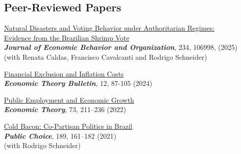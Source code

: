 \documentclass[mm, 10pt]{simple_style}
\begin{document}
\begin{resume}
\begin{minipage}[t]{0.7\textwidth}
\end{minipage}



\section{Peer-Reviewed Papers}
\href{https://doi.org/10.1016/j.jebo.2025.106998}{Natural Disasters and Voting Behavior under Authoritarian Regimes:\\ Evidence from the Brazilian Shrimp Vote} \\
\textbf{\textit{Journal of Economic Behavior and Organization}}, 234, 106998, (2025) \\
(with Renata Caldas, Francisco Cavalcanti and Rodrigo Schneider) 

\href{https://doi.org/10.1007/s40505-024-00265-x}{Financial Exclusion and Inflation Costs}\\
\textbf{\textit{Economic Theory Bulletin}}, 12, 87-105 (2024) 


\href{https://doi.org/10.1007/s00199-020-01333-6}{Public Employment and Economic Growth}\\
\textbf{\textit{Economic Theory}}, 73, 211–236 (2022)  

\href{https://doi.org/10.1007/s11127-020-00869-4}{Cold Bacon: Co-Partisan Politics in Brazil} \\
\textbf{\textit{Public Choice}}, 189, 161–182 (2021) \\
(with Rodrigo Schneider) 


\end{resume}
\end{document}
